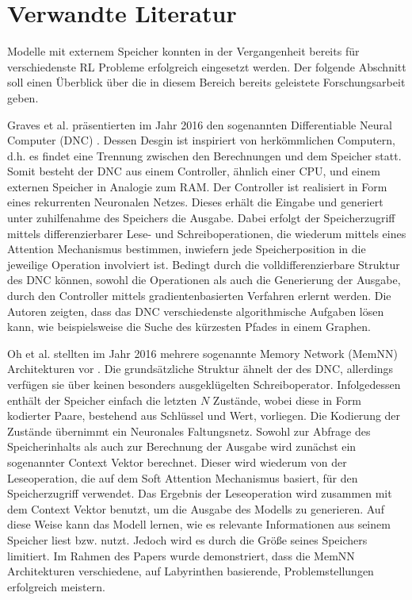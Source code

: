 \chapter{Verwandte Literatur}

Modelle mit externem Speicher konnten in der Vergangenheit bereits für verschiedenste RL Probleme erfolgreich eingesetzt werden. Der folgende Abschnitt soll einen Überblick über die in diesem Bereich bereits geleistete Forschungsarbeit geben.

Graves et al. präsentierten im Jahr 2016 den sogenannten Differentiable Neural Computer (DNC) \cite{DNC}. Dessen Desgin ist inspiriert von herkömmlichen Computern, d.h. es findet eine Trennung zwischen den Berechnungen und dem Speicher statt. Somit besteht der DNC aus einem Controller, ähnlich einer CPU, und einem externen Speicher in Analogie zum RAM. Der Controller ist realisiert in Form eines rekurrenten Neuronalen Netzes. Dieses erhält die Eingabe und generiert unter zuhilfenahme des Speichers die Ausgabe. Dabei erfolgt der Speicherzugriff mittels differenzierbarer Lese- und Schreiboperationen, die wiederum mittels eines Attention Mechanismus bestimmen, inwiefern jede Speicherposition in die jeweilige Operation involviert ist. Bedingt durch die volldifferenzierbare Struktur des DNC können, sowohl die Operationen als auch die Generierung der Ausgabe, durch den Controller mittels gradientenbasierten Verfahren erlernt werden. Die Autoren zeigten, dass das DNC verschiedenste algorithmische Aufgaben lösen kann, wie beispielsweise die Suche des kürzesten Pfades in einem Graphen.

Oh et al. stellten im Jahr 2016 mehrere sogenannte Memory Network (MemNN) Architekturen vor \cite{MemNN}. Die grundsätzliche Struktur ähnelt der des DNC, allerdings verfügen sie über keinen besonders ausgeklügelten Schreiboperator. Infolgedessen enthält der Speicher einfach die letzten $N$ Zustände, wobei diese in Form kodierter Paare, bestehend aus Schlüssel und Wert, vorliegen. Die Kodierung der Zustände übernimmt ein Neuronales Faltungsnetz. Sowohl zur Abfrage des Speicherinhalts als auch zur Berechnung der Ausgabe wird zunächst ein sogenannter Context Vektor berechnet. Dieser wird wiederum von der Leseoperation, die auf dem Soft Attention Mechanismus basiert, für den Speicherzugriff verwendet. Das Ergebnis der Leseoperation wird zusammen mit dem Context Vektor benutzt, um die Ausgabe des Modells zu generieren. Auf diese Weise kann das Modell lernen, wie es relevante Informationen aus seinem Speicher liest bzw. nutzt. Jedoch wird es durch die Größe seines Speichers limitiert. Im Rahmen des Papers wurde demonstriert, dass die MemNN Architekturen verschiedene, auf Labyrinthen basierende, Problemstellungen erfolgreich meistern.

